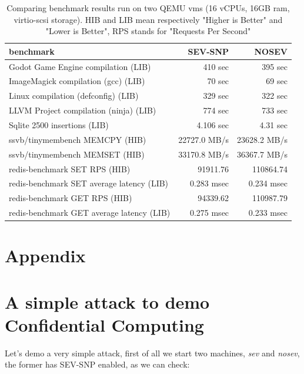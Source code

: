 \documentclass[twocolumn]{article}
\begin{document}
    \begin{table}
        \centering
        \label{tab:tinyben-results}
        \begin{tabular}{l|r|r}
        \textbf{benchmark}                        & \textbf{SEV-SNP} & \textbf{NOSEV} \\
        \hline
        Godot Game Engine compilation (LIB)       &  410 sec         & 395 sec        \\
        ImageMagick compilation (gcc) (LIB)       &  70 sec          & 69 sec         \\
        Linux compilation (defconfig) (LIB)       &  329 sec         & 322 sec        \\
        LLVM Project compilation (ninja) (LIB)    &  774 sec         & 733 sec        \\
        Sqlite 2500 insertions (LIB)              &  4.106 sec       & 4.31 sec       \\
        ssvb/tinymembench MEMCPY (HIB)            &  22727.0 MB/s    & 23628.2 MB/s   \\
        ssvb/tinymembench MEMSET (HIB)            &  33170.8 MB/s    & 36367.7 MB/s   \\
        redis-benchmark SET RPS (HIB)             &  91911.76        & 110864.74      \\
        redis-benchmark SET average latency (LIB) &  0.283 msec      & 0.234 msec     \\
        redis-benchmark GET RPS (HIB)             &  94339.62        & 110987.79      \\
        redis-benchmark GET average latency (LIB) &  0.275 msec	     & 0.233 msec     \\
        \end{tabular}
        \caption{Comparing benchmark results run on two QEMU vms (16 vCPUs, 16GB ram, virtio-scsi storage). HIB and LIB mean respectively "Higher is Better" and "Lower is Better", RPS stands for "Requests Per Second"} 
    \end{table}

\printbibliography
\appendix

\section*{Appendix}
    \section{A simple attack to demo Confidential Computing}
    Let's demo a very simple attack, first of all we start two machines, \textit{sev} and \textit{nosev}, the former has SEV-SNP enabled, as we can check:
\end{document}
